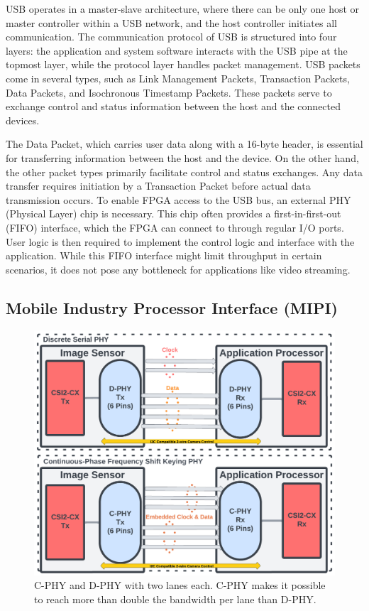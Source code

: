 USB operates in a master-slave architecture, where there can be only one host or master controller within a USB network, and the host controller initiates all communication. The communication protocol of USB is structured into four layers: the application and system software interacts with the USB pipe at the topmost layer, while the protocol layer handles packet management. USB packets come in several types, such as Link Management Packets, Transaction Packets, Data Packets, and Isochronous Timestamp Packets. These packets serve to exchange control and status information between the host and the connected devices.

The Data Packet, which carries user data along with a 16-byte header, is essential for transferring information between the host and the device. On the other hand, the other packet types primarily facilitate control and status exchanges. Any data transfer requires initiation by a Transaction Packet before actual data transmission occurs. To enable FPGA access to the USB bus, an external PHY (Physical Layer) chip is necessary. This chip often provides a first-in-first-out (FIFO) interface, which the FPGA can connect to through regular I/O ports. User logic is then required to implement the control logic and interface with the application. While this FIFO interface might limit throughput in certain scenarios, it does not pose any bottleneck for applications like video streaming. 





\subsection{Mobile Industry Processor Interface (MIPI)}

\begin{figure}[!h]
\centering
\includegraphics[width=0.7\linewidth]{Images/MIPI.png}
\caption[MIPI Architecture]{C-PHY and D-PHY with two lanes each. C-PHY makes it possible to reach more than double the bandwidth per lane than D-PHY.}
\label{fig:MIPI}
\end{figure} 


